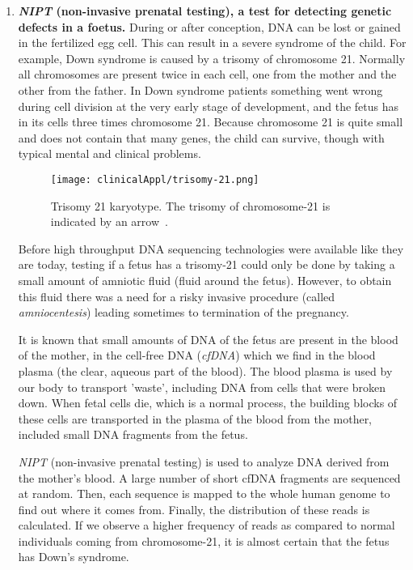 \begin{enumerate}
	\item \textbf{\emph{NIPT} (non-invasive prenatal testing), a test for detecting genetic defects in a foetus.}\newline
	During or after conception, DNA can be lost or gained in the fertilized egg cell. This can result in a severe syndrome of the child. For example, Down syndrome is caused by a trisomy of chromosome 21. Normally all chromosomes are present twice in each cell, one from the mother and the other from the father. In Down syndrome patients something went wrong during cell division at the very early stage of development, and the fetus has in its cells three times chromosome 21. 
	Because chromosome 21 is quite small and does not contain that many genes, the child can survive, though with typical mental and clinical problems.
	
	\begin{figure}[H]
		\centering
		\texttt{[image: clinicalAppl/trisomy-21.png]}
		\caption{Trisomy 21 karyotype. The trisomy of chromosome-21 is indicated by an arrow~\cite{11}.}
		\label{fig:tri21}
	\end{figure}
	
	
	Before high throughput DNA sequencing technologies were available like they are today, testing if a fetus has a trisomy-21 could only be done by taking a small amount of amniotic fluid (fluid around the fetus). However, to obtain this fluid there was a need for a risky invasive procedure (called \emph{amniocentesis}) leading sometimes to termination of the pregnancy.
	
	It is known that small amounts of DNA of the fetus are present in the blood of the mother, in the cell-free DNA (\emph{cfDNA}) which we find in the blood plasma (the clear, aqueous part of the blood). The blood plasma is used by our body to transport 'waste', including DNA from cells that were broken down. When fetal cells die, which is a normal process, the building blocks of these cells are transported in the plasma of the blood from the mother, included small DNA fragments from the fetus.
	
	\emph{NIPT} (non-invasive prenatal testing) is used to analyze DNA derived from the mother's blood. A large number of short cfDNA fragments are sequenced at random.  Then, each sequence is mapped to the whole human genome to find out where it comes from. Finally, the distribution of these reads is calculated. If we observe a higher frequency of reads as compared to normal individuals coming from chromosome-21, it is almost certain that the fetus has Down's syndrome.
	

\end{enumerate}
